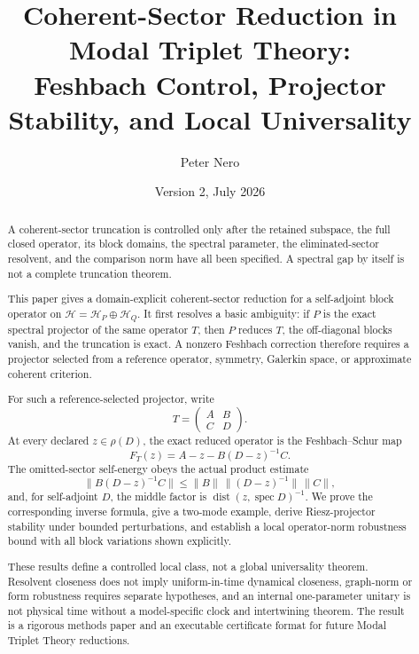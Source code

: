 \documentclass[11pt]{article}
\title{\vspace{-1em}
Coherent-Sector Reduction in Modal Triplet Theory:\\[0.25em]
\large Feshbach Control, Projector Stability, and Local Universality}
\author{Peter Nero}
\date{Version 2, July 2026}
\theoremstyle{definition}
\theoremstyle{remark}
\newcommand{\cH}{\mathcal H}
\newcommand{\1}{\mathbf 1}
\newcommand{\dist}{\operatorname{dist}}
\newcommand{\spec}{\operatorname{spec}}
\newcommand{\MTT}{Modal Triplet Theory}
\begin{document}
\maketitle

\begin{abstract}
A coherent-sector truncation is controlled only after the retained
subspace, the full closed operator, its block domains, the spectral
parameter, the eliminated-sector resolvent, and the comparison norm have
all been specified.  A spectral gap by itself is not a complete
truncation theorem.

This paper gives a domain-explicit coherent-sector reduction for a
self-adjoint block operator on
\(\cH=\cH_P\oplus\cH_Q\).  It first resolves a basic ambiguity: if \(P\)
is the exact spectral projector of the same operator \(T\), then \(P\)
reduces \(T\), the off-diagonal blocks vanish, and the truncation is exact.
A nonzero Feshbach correction therefore requires a projector selected from
a reference operator, symmetry, Galerkin space, or approximate coherent
criterion.

For such a reference-selected projector, write
\[
 T=
 \begin{pmatrix}A&B\\ C&D\end{pmatrix}.
\]
At every declared \(z\in\rho(D)\), the exact reduced operator is the
Feshbach--Schur map
\[
 F_T(z)=A-z-B(D-z)^{-1}C.
\]
The omitted-sector self-energy obeys the actual product estimate
\[
 \|B(D-z)^{-1}C\|
 \leq
 \|B\|\,\|(D-z)^{-1}\|\,\|C\|,
\]
and, for self-adjoint \(D\), the middle factor is
\(\dist(z,\spec D)^{-1}\).  We prove the corresponding inverse formula,
give a two-mode example, derive Riesz-projector stability under bounded
perturbations, and establish a local operator-norm robustness bound with
all block variations shown explicitly.

These results define a controlled local class, not a global universality
theorem.  Resolvent closeness does not imply uniform-in-time dynamical
closeness, graph-norm or form robustness requires separate hypotheses, and
an internal one-parameter unitary is not physical time without a
model-specific clock and intertwining theorem.  The result is a rigorous
methods paper and an executable certificate format for future
\MTT{} reductions.
\end{abstract}
\end{document}

